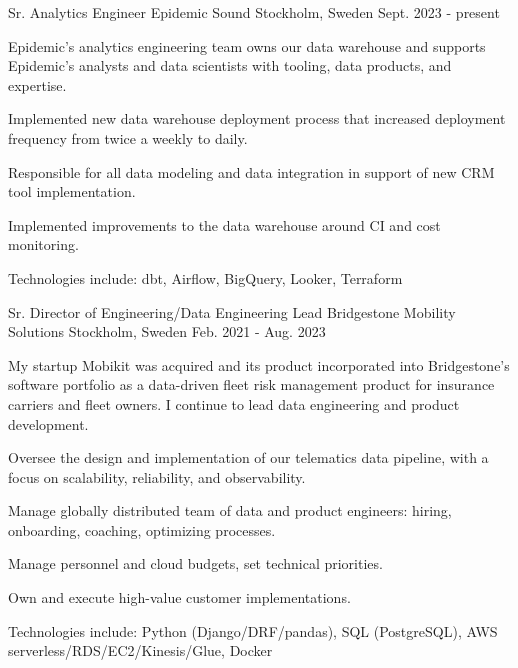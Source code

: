 

\begin{cventries}

  \cventry
    {Sr. Analytics Engineer} %
    {Epidemic Sound} %
    {Stockholm, Sweden} %
    {Sept. 2023 - present} %
    {
    Epidemic's analytics engineering team owns our data warehouse and supports Epidemic's analysts
    and data scientists with tooling, data products, and expertise.
    \vspace{5.0mm}
      \begin{cvitems} %
        \item {Implemented new data warehouse deployment process that increased deployment frequency from twice a weekly to daily.}
        \item {Responsible for all data modeling and data integration in support of new CRM tool implementation.}
        \item {Implemented improvements to the data warehouse around CI and cost monitoring.}
        \item {Technologies include: dbt, Airflow, BigQuery, Looker, Terraform}
      \end{cvitems}
    }

  \cventry
    {Sr. Director of Engineering/Data Engineering Lead} %
    {Bridgestone Mobility Solutions} %
    {Stockholm, Sweden} %
    {Feb. 2021 - Aug. 2023} %
    {
    My startup Mobikit was acquired and its product incorporated into Bridgestone's software portfolio as a data-driven fleet risk management product for insurance carriers and fleet owners. I continue to lead data engineering and product development.
    \vspace{5.0mm}
      \begin{cvitems} %
        \item {Oversee the design and implementation of our telematics data pipeline, with a focus on scalability, reliability, and observability.}
        \item {Manage globally distributed team of data and product engineers: hiring, onboarding, coaching, optimizing processes.}
        \item {Manage personnel and cloud budgets, set technical priorities.}
        \item {Own and execute high-value customer implementations.}
        \item {Technologies include: Python (Django/DRF/pandas), SQL (PostgreSQL), AWS serverless/RDS/EC2/Kinesis/Glue, Docker}
      \end{cvitems}
    }


\end{cventries}
